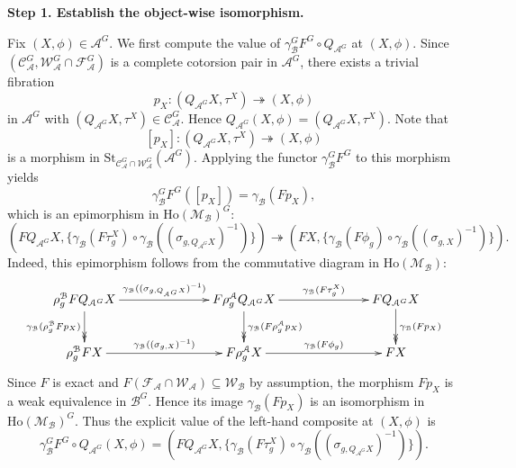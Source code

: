\documentclass[12pt,twoside]{amsart}
\theoremstyle{bfupright head,slanted body}
\theoremstyle{bfupright head,upright body}
\theoremstyle{fixed bf head,slanted body}
\theoremstyle{fixed bf head,upright body}
\theoremstyle{numbered paragraph}
\newenvironment{prf*}[1][Proof]{%
  \begin{proof}[\bf #1]
    \setcounter{equation}{0}
    \renewcommand{\theequation}{\arabic{equation}}}
  {\end{proof}
}
\numberwithin{equation}{res}
\newcommand{\calC}{\mathcal{C}}
\newcommand{\calW}{\mathcal{W}}
\newcommand{\calF}{\mathcal{F}}
\newcommand{\calA}{\mathcal{A}}
\newcommand{\calB}{\mathcal{B}}
\newcommand{\calM}{\mathcal{M}}
\newcommand{\Ho}{\mathrm{Ho}}
\newcommand{\St}{\mathrm{St}}
\begin{document}
\begin{prf*}
\vspace{1ex}\textbf{Step 1. Establish the object-wise isomorphism.}

Fix $(X,\phi)\in\calA^G$.
We first compute the value of $\gamma_\calB^G F^G \circ Q_{\calA^G}$ at $(X, \phi)$.
Since $(\calC_\calA^G,\calW_\calA^G\cap\calF_\calA^G)$ is a complete cotorsion pair in $\calA^G$, there exists a trivial fibration
\[
p_X:(Q_{\calA^G}X,\tau^X)\twoheadrightarrow(X,\phi)
\]
in $\calA^G$ with $(Q_{\calA^G}X,\tau^X)\in\calC_\calA^G$.
Hence $Q_{\calA^G}(X, \phi) = (Q_{\calA^G} X, \tau^X)$.
Note that
\[
[p_X] : (Q_{\calA^G}X, \tau^X) \twoheadrightarrow (X, \phi)
\]
is a morphism in $\St_{\calC_\calA^G \cap \calW_\calA^G}(\calA^G)$.
Applying the functor $\gamma_\calB^G F^G$ to this morphism yields
\[
\gamma_\calB^G F^G([p_X]) = \gamma_\calB(F p_X),
\]
which is an epimorphism in $\Ho(\calM_\calB)^G$:
\[
(FQ_{\calA^G}X,\{\gamma_\calB(F\tau^X_g)\circ\gamma_\calB((\sigma_{g,Q_{\calA^G}X})^{-1})\})
\twoheadrightarrow
(FX,\{\gamma_\calB(F\phi_g)\circ\gamma_\calB((\sigma_{g,X})^{-1})\}).
\]
Indeed, this epimorphism follows from the commutative diagram in $\Ho(\calM_\calB)$:
\[
\xymatrix@C=2.5CM{
   \rho^\calB_g F Q_{\calA^G} X   \ar@{->>}[d]_-{\gamma_\calB(\rho^\calB_g F p_X)}
                                   \ar[r]^-{\gamma_\calB((\sigma_{g, Q_{\calA^G} X})^{-1})}
&  F \rho^\calA_g Q_{\calA^G} X   \ar@{->>}[d]^-{\gamma_\calB(F \rho^\calA_g p_X)}
                                      \ar[r]^-{\gamma_\calB(F \tau^X_g)}
&  F Q_{\calA^G} X                \ar@{->>}[d]^-{\gamma_\calB(F p_X)}             \\
   \rho^\calB_g F X               \ar[r]^-{\gamma_\calB((\sigma_{g, X})^{-1})}
&  F \rho^\calA_g X               \ar[r]^-{\gamma_\calB(F \phi_g)}
&  F X                                                        }
\]
Since $F$ is exact and $F(\calF_\calA \cap \calW_\calA) \subseteq \calW_\calB$ by assumption, the morphism $Fp_X$ is a weak equivalence in $\calB^G$.
Hence its image $\gamma_\calB(F p_X)$ is an isomorphism in $\Ho(\calM_\calB)^G$.
Thus the explicit value of the left-hand composite at $(X,\phi)$ is
\[
\gamma_\calB^G F^G \circ Q_{\calA^G}(X,\phi)
= (FQ_{\calA^G}X,\{\gamma_\calB(F\tau^X_g)\circ\gamma_\calB((\sigma_{g,Q_{\calA^G}X})^{-1})\}).
\]


\end{prf*}
\end{document}
